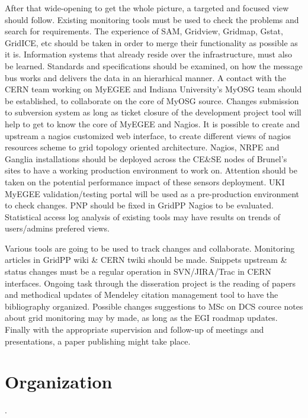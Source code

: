 After that wide-opening to get the whole picture, a targeted and focused
view should follow. Existing monitoring tools must be used to check the problems
and search for requirements. The experience of SAM, Gridview, Gridmap, Gstat,
GridICE, etc should be taken in order to merge their functionality as possible
as it is. Information systems that already reside over the infrastructure, must
also be learned. Standards and specifications should be examined, on how the
message bus works and delivers the data in an hierarhical manner. A contact
with the CERN team working on MyEGEE and Indiana University's MyOSG team should
be established, to collaborate on the core of MyOSG source. Changes submission
to subversion system as long as ticket closure of the development project tool
will help to get to know the core of MyEGEE and Nagios. It is possible to create
and upstream a nagios customized web interface, to create different views of
nagios resources scheme to grid topology oriented architecture. Nagios, NRPE and
Ganglia installations should be deployed across the CE\&SE nodes of Brunel's
sites to have a working production environment to work on. Attention should be
taken on the potential performance impact of these sensors deployment. UKI
MyEGEE validation/testing portal will be used as a pre-production environment
to check changes. PNP should be fixed in GridPP Nagios to be evaluated.
Statistical access log analysis of existing tools may have results on trends of
users/admins prefered views.

Various tools are going to be used to track changes and collaborate. Monitoring
articles in GridPP wiki \& CERN twiki should be made. Snippets upstream \&
status changes must be a regular operation in SVN/JIRA/Trac in CERN interfaces.
Ongoing task through the disseration project is the reading of papers and
methodical updates of Mendeley citation management tool to have the bibliography
organized. Possible changes suggestions to MSc on DCS cource notes about grid
monitoring may by made, as long as the EGI roadmap updates. Finally with the
appropriate supervision and follow-up of meetings and presentations, a paper publishing
might take place.

\section{Organization}.